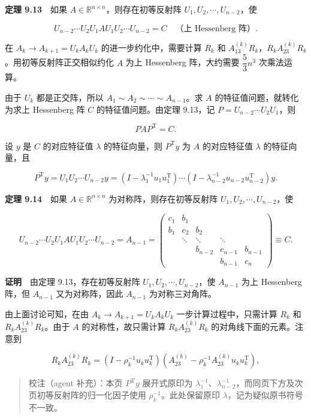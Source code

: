 \documentclass[
  10pt,
  fontset=fandol]{ctexart}
\begin{document}
\textbf{定理 9.13}　如果 \(A\in\mathbb R^{n\times n}\)，则存在初等反射阵 \(U_1,U_2,\cdots,U_{n-2}\)，使

\[
U_{n-2}\cdots U_2U_1AU_1U_2\cdots U_{n-2}=C\quad\text{（上 Hessenberg 阵）}.
\]

在 \(A_k\to A_{k+1}=U_kA_kU_k\) 的进一步约化中，需要计算 \(R_k\) 和 \(A_{13}^{(k)}R_k\)，\(R_kA_{23}^{(k)}R_k\)。用初等反射阵正交相似约化 \(A\) 为上 Hessenberg 阵，大约需要 \(\dfrac53n^3\) 次乘法运算。

由于 \(U_k\) 都是正交阵，所以 \(A_1\sim A_2\sim\cdots\sim A_{n-1}\)。求 \(A\) 的特征值问题，就转化为求上 Hessenberg 阵 \(C\) 的特征值问题。由定理 9.13，记 \(P=U_{n-2}\cdots U_2U_1\)，则

\[
PAP^{\mathrm T}=C.
\]

设 \(y\) 是 \(C\) 的对应特征值 \(\lambda\) 的特征向量，则 \(P^{\mathrm T}y\) 为 \(A\) 的对应特征值 \(\lambda\) 的特征向量，且

\[
P^{\mathrm T}y=U_1U_2\cdots U_{n-2}y
=(I-\lambda_1^{-1}u_1u_1^{\mathrm T})\cdots(I-\lambda_{n-2}^{-1}u_{n-2}u_{n-2}^{\mathrm T})y.
\]

\textbf{定理 9.14}　如果 \(A\in\mathbb R^{n\times n}\) 为对称阵，则存在初等反射阵 \(U_1,U_2,\cdots,U_{n-2}\)，使

\[
U_{n-2}\cdots U_2U_1AU_1U_2\cdots U_{n-2}=A_{n-1}
=\begin{pmatrix}
c_1&b_1&&&\\
b_1&c_2&b_2&&\\
&\ddots&\ddots&\ddots&\\
&&b_{n-2}&c_{n-1}&b_{n-1}\\
&&&b_{n-1}&c_n
\end{pmatrix}\equiv C.
\]

\textbf{证明}　由定理 9.13，存在初等反射阵 \(U_1,U_2,\cdots,U_{n-2}\)，使 \(A_{n-1}\) 为上 Hessenberg 阵，但 \(A_{n-1}\) 又为对称阵，因此 \(A_{n-1}\) 为对称三对角阵。

由上面讨论可知，在由 \(A_k\to A_{k+1}=U_kA_kU_k\) 一步计算过程中，只需计算 \(R_k\) 和 \(R_kA_{23}^{(k)}R_k\)。由于 \(A\) 的对称性，故只需计算 \(R_kA_{23}^{(k)}R_k\) 的对角线下面的元素。注意到

\[
R_kA_{23}^{(k)}R_k=(I-\rho_k^{-1}u_ku_k^{\mathrm T})(A_{23}^{(k)}-\rho_k^{-1}A_{23}^{(k)}u_ku_k^{\mathrm T}),
\]

\begin{quote}
校注（agent 补充）：本页 \(P^{\mathrm T}y\) 展开式原印为 \(\lambda_1^{-1}\)、\(\lambda_{n-2}^{-1}\)，而同页下方及次页初等反射阵的归一化因子使用 \(\rho_k^{-1}\)。此处保留原印 \(\lambda\)，记为疑似原书符号不一致。
\end{quote}
\end{document}
